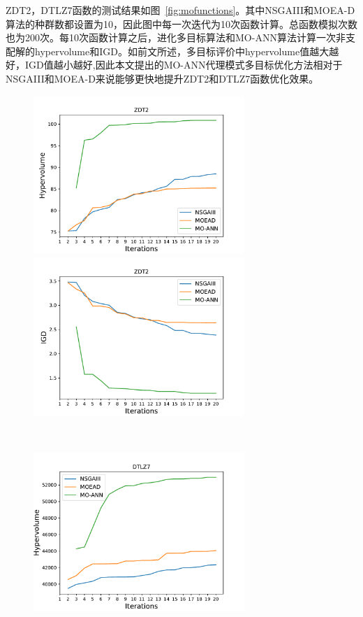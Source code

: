 ZDT2，DTLZ7函数的测试结果如图~\ref{fig:mofunctions}。其中NSGAIII和MOEA-D算法的种群数都设置为10，因此图中每一次迭代为10次函数计算。总函数模拟次数也为200次。每10次函数计算之后，进化多目标算法和MO-ANN算法计算一次非支配解的hypervolume和IGD。如前文所述，多目标评价中hypervolume值越大越好，IGD值越小越好,因此本文提出的MO-ANN代理模式多目标优化方法相对于NSGAIII和MOEA-D来说能够更快地提升ZDT2和DTLZ7函数优化效果。
\begin{figure}[H]
\centering
\begin{minipage}[t]{0.48\textwidth}
\centering
\includegraphics[width=8cm]{figures/hyper_ZDT2.pdf}
\end{minipage}
\begin{minipage}[t]{0.48\textwidth}
\centering
\includegraphics[width=8cm]{figures/igd_ZDT2.pdf}
\end{minipage}
\\
\centering
\begin{minipage}[t]{0.48\textwidth}
\centering
\includegraphics[width=8cm]{figures/hyper_DTLZ7.pdf}

\end{minipage}
\end{figure}
